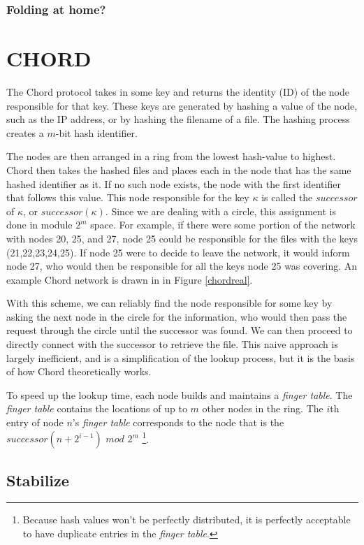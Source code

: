 \documentclass[conference, compsocconf, letterpaper]{IEEEtran}
\begin{document}
\subsubsection{Folding at home?}

\section{CHORD}
The Chord protocol \cite{Chord} takes in some key and returns the identity (ID) of the node responsible for that key.  These keys are generated by hashing a value of the node, such as the IP address, or by hashing  the filename of a file.  The hashing process creates a $m$-bit hash identifier.

The nodes are then arranged in a ring from the lowest hash-value to highest.  Chord then takes the hashed files and places each in the node that has the same hashed identifier as it.  If no such node exists, the node with the first identifier that follows this value.  This node responsible for the key $\kappa$ is called the $successor$ of $\kappa$, or $successor(\kappa)$.  Since we are dealing with a circle, this assignment is done in module $2^m$ space.  For example, if there were some portion of the network with nodes 20, 25, and 27, node 25 could be responsible for the files with the keys (21,22,23,24,25). If node 25 were to decide to leave the network, it would inform node 27, who would then be responsible for all the keys node 25 was covering. An example Chord network is drawn in in Figure \ref{chordreal}.

With this scheme, we can reliably find the node responsible for some key by asking the next node in the circle for the information, who would then pass the request through the circle until the successor was found.  We can then proceed to directly connect with the successor to retrieve the file.  This naive approach is largely inefficient, and is a simplification of the lookup process, but it is the basis of how Chord theoretically works.

To speed up the lookup time, each node builds and maintains a \emph{finger table}.  The \emph{finger table} contains the locations of up to $m$ other nodes in the ring.  The $i$th entry of node $n$'s \emph{finger table} corresponds to the node that is the $successor(n+2^{i-1})$ $mod$ $2^m$ \footnote{Because hash values won't be perfectly distributed, it is perfectly acceptable to have duplicate entries in the \emph{finger table}.}. 


\subsection{Stabilize} 
\end{document}

